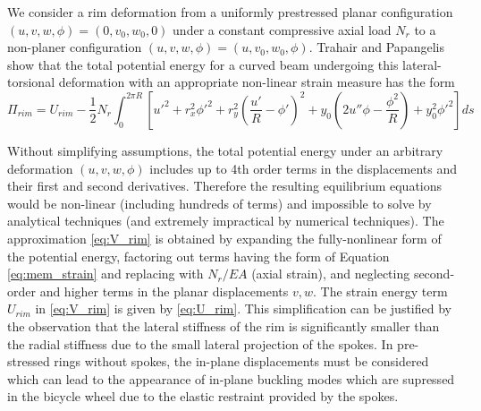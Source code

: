 \documentclass[\rootdir/thesis.tex]{subfiles}
\begin{document}
We consider a rim deformation from a uniformly prestressed planar configuration $(u,v,w,\phi) = (0,v_0,w_0,0)$  under a constant compressive axial load $N_r$ to a non-planer configuration $(u,v,w,\phi) = (u,v_0,w_0,\phi)$. Trahair and Papangelis show that the total potential energy for a curved beam undergoing this lateral-torsional deformation with an appropriate non-linear strain measure has the form \cite{Trahair1987}
\begin{equation}
\label{eq:V_rim}
\Pi_{rim} = U_{rim} - \frac{1}{2}N_r \int_0^{2\pi R}
	\left[u'^2 + r_x^2\phi'^2 + r_y^2\left(\frac{u'}{R} - \phi'\right)^2
	      + y_0\left(2u''\phi - \frac{\phi^2}{R}\right) + y_0^2\phi'^2 \right]ds
\end{equation}

Without simplifying assumptions, the total potential energy under an arbitrary deformation $(u,v,w,\phi)$ includes up to 4th order terms in the displacements and their first and second derivatives. Therefore the resulting equilibrium equations would be non-linear (including hundreds of terms) and impossible to solve by analytical techniques (and extremely impractical by numerical techniques). The approximation \eqref{eq:V_rim} is obtained by expanding the fully-nonlinear form of the potential energy, factoring out terms having the form of Equation \eqref{eq:mem_strain} and replacing with $N_r/EA$ (axial strain), and neglecting second-order and higher terms in the planar displacements $v,w$. The strain energy term $U_{rim}$ in \eqref{eq:V_rim} is given by \eqref{eq:U_rim}. This simplification can be justified by the observation that the lateral stiffness of the rim is significantly smaller than the radial stiffness due to the small lateral projection of the spokes. In pre-stressed rings without spokes, the in-plane displacements must be considered which can lead to the appearance of in-plane buckling modes which are supressed in the bicycle wheel due to the elastic restraint provided by the spokes.
\end{document}
